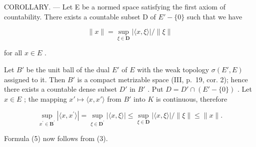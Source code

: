 COROLLARY. --- Let E be a normed space satisfying the first axiom of countability. There exists a countable subset D of \(E' - \{0\}\) such that we have

\[
\| x \| = \sup _ {\xi \in \mathbf {D}} | \langle x, \xi \rangle | / \| \xi \|\tag{5}
\]

for all \(x \in E\) .

Let \(B'\) be the unit ball of the dual \(E'\) of \(E\) with the weak topology \(\sigma(E', E)\) assigned to it. Then \(B'\) is a compact metrizable space (III, p.~19, cor. 2); hence there exists a countable dense subset \(D'\) in \(B'\) . Put \(D = D' \cap (E' - \{0\})\) . Let \(x \in E\) ; the mapping \(x' \mapsto \langle x, x' \rangle\) from \(B'\) into \(K\) is continuous, therefore

\[
\sup _ {x ^ {\prime} \in \mathbf {B} ^ {\prime}} | \langle x, x ^ {\prime} \rangle | = \sup _ {\xi \in \mathbf {D} ^ {\prime}} | \langle x, \xi \rangle | \leqslant \sup _ {\xi \in \mathbf {D}} | \langle x, \xi \rangle | / \| \xi \| \leqslant \| x \|.
\]

Formula (5) now follows from (3).

